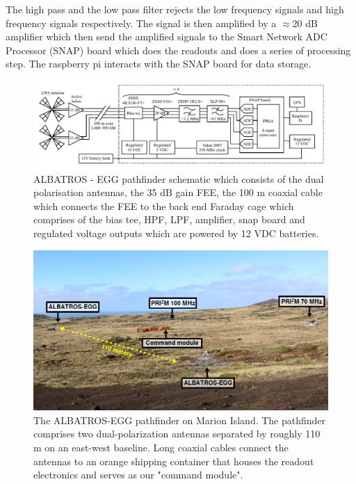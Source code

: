 \documentclass{ws-jai}
\begin{document}
The high pass and the low pass filter rejects the low frequency signals and high frequency signals respectively. The signal is then amplified by a $\approx$20 dB amplifier which then send the amplified signals to the Smart Network ADC Processor (SNAP) board which does the readouts and does a series of processing step. The raspberry pi interacts with the SNAP board for data storage.\\


\begin{figure}[h!]
	\begin{center}
		\includegraphics[width=1.0\linewidth]{Figures/albatros_2elem_schematic/albatros_2elem_schematic.pdf}
		\caption{ALBATROS - EGG pathfinder schematic which consists of the dual polarisation antennas, the 35 dB gain FEE, the 100 m coaxial cable which connects the FEE to the back end Faraday cage which comprises of the bias tee, HPF, LPF, amplifier, snap board and regulated voltage outputs which are powered by 12 VDC batteries.}
		\label{Fig:ALBATROS-EGG Schematic}
	\end{center}
\end{figure}

	\begin{figure}[h]
		\begin{center}
			\includegraphics[width=0.7\linewidth]{Figures/ALBATROS-EGG.PNG}
			\caption{The ALBATROS-EGG pathfinder on Marion Island. The pathfinder comprises two dual-polarization antennas separated by roughly 110 m on an east-west baseline. Long coaxial cables connect the antennas to	an orange shipping container that houses the readout electronics and serves as our "command module".}
			\label{Fig:ALBATROS-EGG}
		\end{center}
	\end{figure}
\end{document}
